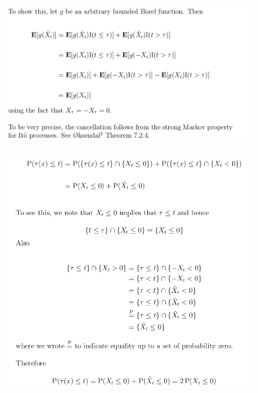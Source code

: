 \documentclass[c, dvipsnames, 8pt]{beamer}
\begin{document}
\begin{frame}[shrink=5]
	
	
	\frametitle{\insertsection} 
	\begin{figure}
		\centering
		\includegraphics[width=1\linewidth]{screenshot020}
		\label{fig:screenshot001}
	\end{figure}
	
	
	
	
	
	
	
	
\end{frame}




\begin{frame}[shrink=5]
	
	
	\frametitle{\insertsection} 
	\begin{figure}
		\centering
		\includegraphics[width=1\linewidth]{screenshot022}
		\label{fig:screenshot001}
	\end{figure}

	
	
	
	
\end{frame}
\end{document}
